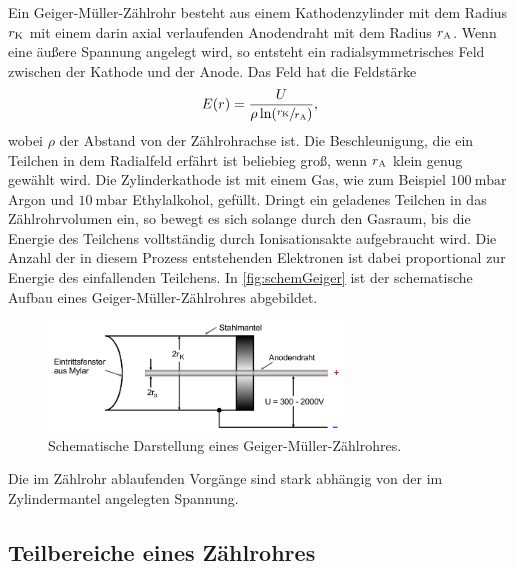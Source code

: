 Ein Geiger-Müller-Zählrohr besteht aus einem Kathodenzylinder mit dem Radius $r_{\text K}$ mit einem darin axial verlaufenden Anodendraht mit dem Radius $r_{\text A}$.
Wenn eine äußere Spannung angelegt wird, so entsteht ein radialsymmetrisches Feld zwischen der Kathode und der Anode.
Das Feld hat die Feldstärke
\begin{align}
    E(r)=\frac{U}{\rho\ln(\sfrac{r_{\text K}}{r_{\text A}})},
\end{align}
wobei $\rho$ der Abstand von der Zählrohrachse ist.
Die Beschleunigung, die ein Teilchen in dem Radialfeld erfährt ist beliebieg groß, wenn $r_{\text A}$ klein genug gewählt wird. \newline
Die Zylinderkathode ist mit einem Gas, wie zum Beispiel $\SI{100}{\milli\bar}$ Argon und $\SI{10}{\milli\bar}$ Ethylalkohol, gefüllt. Dringt ein geladenes Teilchen
in das Zählrohrvolumen ein, so bewegt es sich solange durch den Gasraum, bis die Energie des Teilchens volltständig durch Ionisationsakte aufgebraucht wird. Die Anzahl
der in diesem Prozess entstehenden Elektronen ist dabei proportional zur Energie des einfallenden Teilchens.
In \autoref{fig:schemGeiger} ist der schematische Aufbau eines Geiger-Müller-Zählrohres abgebildet.
\begin{figure}[H]
    \centering
    \includegraphics[width=0.7\textwidth]{data/zaehlrohr.png}
    \caption{Schematische Darstellung eines Geiger-Müller-Zählrohres.}
    \label{fig:schemGeiger}
\end{figure}

Die im Zählrohr ablaufenden Vorgänge sind stark abhängig von der im Zylindermantel angelegten Spannung.

\subsection{Teilbereiche eines Zählrohres}
\label{subsec:TheoVerlauf}

